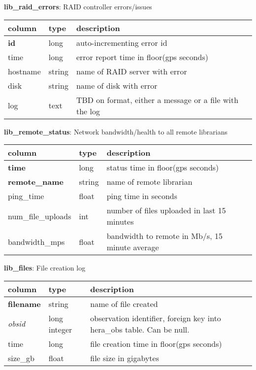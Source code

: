 \documentclass{article}
\begin{document}
\textbf{\large{lib\_raid\_errors}}: RAID controller errors/issues
\begin{center}
 \begin{tabular}{| p{4cm} | p{2cm} | p{10cm} |} 
\hline
 column & type & description \\ [0.5ex]  \hline\hline
\textbf{id} & long & auto-incrementing error id\\ \hline
time & long & error report time in floor(gps seconds)\\ \hline
hostname & string & name of RAID server with error \\ \hline
disk & string & name of disk with error \\ \hline
log & text & TBD on format, either a message or a file with the log \\\hline
\end{tabular}
\end{center}

\textbf{\large{lib\_remote\_status}}: Network bandwidth/health to all remote librarians
\begin{center}
 \begin{tabular}{| p{4cm} | p{2cm} | p{10cm} |} 
\hline
 column & type & description \\ [0.5ex]  \hline\hline
\textbf{time} & long & status time in floor(gps seconds)\\ \hline
\textbf{remote\_name} & string & name of remote librarian \\ \hline
ping\_time & float & ping time in seconds \\\hline
num\_file\_uploads & int & number of files uploaded in last 15 minutes  \\\hline
bandwidth\_mps & float & bandwidth to remote in Mb/s, 15 minute average \\\hline
\end{tabular}
\end{center}

\textbf{\large{lib\_files}}: File creation log
\begin{center}
 \begin{tabular}{| p{4cm} | p{2cm} | p{10cm} |} 
\hline
 column & type & description \\ [0.5ex]  \hline\hline
\textbf{filename} & string & name of file created \\ \hline
\textit{obsid} & long integer & observation identifier, foreign key into hera\_obs table. Can be null. \\ \hline
time & long & file creation time in floor(gps seconds)\\ \hline
size\_gb & float & file size in gigabytes \\ \hline
\end{tabular}
\end{center}
\end{document}
